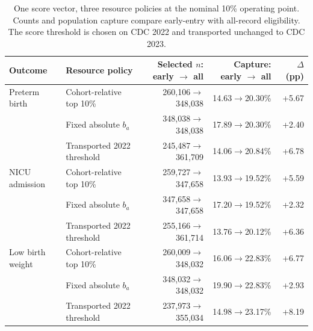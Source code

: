 \begin{table}[!htbp]
\centering
\caption{One score vector, three resource policies at the nominal 10\% operating point. Counts and population capture compare early-entry with all-record eligibility. The score threshold is chosen on CDC 2022 and transported unchanged to CDC 2023.}
\label{tab:policy_contrasts}
\small
\setlength{\tabcolsep}{3.5pt}
\begin{tabular*}{\linewidth}{@{\extracolsep{\fill}}llrrr@{}}
\toprule
Outcome & Resource policy & Selected $n$: early $\rightarrow$ all & Capture: early $\rightarrow$ all & $\Delta$ (pp) \\
\midrule
Preterm birth & Cohort-relative top 10\% & 260,106$\rightarrow$348,038 & 14.63$\rightarrow$20.30\% & +5.67 \\
 & Fixed absolute $b_a$ & 348,038$\rightarrow$348,038 & 17.89$\rightarrow$20.30\% & +2.40 \\
 & Transported 2022 threshold & 245,487$\rightarrow$361,709 & 14.06$\rightarrow$20.84\% & +6.78 \\
\addlinespace
NICU admission & Cohort-relative top 10\% & 259,727$\rightarrow$347,658 & 13.93$\rightarrow$19.52\% & +5.59 \\
 & Fixed absolute $b_a$ & 347,658$\rightarrow$347,658 & 17.20$\rightarrow$19.52\% & +2.32 \\
 & Transported 2022 threshold & 255,166$\rightarrow$361,714 & 13.76$\rightarrow$20.12\% & +6.36 \\
\addlinespace
Low birth weight & Cohort-relative top 10\% & 260,009$\rightarrow$348,032 & 16.06$\rightarrow$22.83\% & +6.77 \\
 & Fixed absolute $b_a$ & 348,032$\rightarrow$348,032 & 19.90$\rightarrow$22.83\% & +2.93 \\
 & Transported 2022 threshold & 237,973$\rightarrow$355,034 & 14.98$\rightarrow$23.17\% & +8.19 \\
\bottomrule
\end{tabular*}
\end{table}
